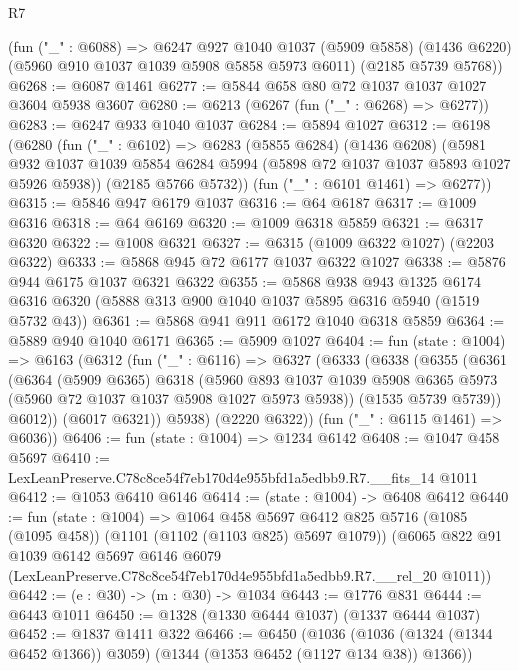 \begin{lexlean}{R7}
\begin{coremodule}
    (fun ("_" : @6088) =>
    @6247
      @927
      @1040
      @1037
      (@5909 @5858)
      (@1436 @6220)
      (@5960 @910 @1037 @1039 @5908 @5858 @5973 @6011)
      (@2185 @5739 @5768))
@6268 := @6087 @1461
@6277 := @5844 @658 @80 @72 @1037 @1037 @1027 @3604 @5938 @3607
@6280 := @6213 (@6267 (fun ("_" : @6268) => @6277))
@6283 := @6247 @933 @1040 @1037
@6284 := @5894 @1027
@6312 := @6198
    (@6280
      (fun ("_" : @6102) =>
      @6283
        (@5855 @6284)
        (@1436 @6208)
        (@5981 @932 @1037 @1039 @5854 @6284 @5994 (@5898 @72 @1037 @1037 @5893 @1027 @5926 @5938))
        (@2185 @5766 @5732))
      (fun ("_" : @6101 @1461) => @6277))
@6315 := @5846 @947 @6179 @1037
@6316 := @64 @6187
@6317 := @1009 @6316
@6318 := @64 @6169
@6320 := @1009 @6318 @5859
@6321 := @6317 @6320
@6322 := @1008 @6321
@6327 := @6315 (@1009 @6322 @1027) (@2203 @6322)
@6333 := @5868 @945 @72 @6177 @1037 @6322 @1027
@6338 := @5876 @944 @6175 @1037 @6321 @6322
@6355 := @5868
    @938
    @943
    @1325
    @6174
    @6316
    @6320
    (@5888 @313 @900 @1040 @1037 @5895 @6316 @5940 (@1519 @5732 @43))
@6361 := @5868 @941 @911 @6172 @1040 @6318 @5859
@6364 := @5889 @940 @1040 @6171
@6365 := @5909 @1027
@6404 := fun (state : @1004) =>
  @6163
    (@6312
      (fun ("_" : @6116) =>
      @6327
        (@6333
          (@6338
            (@6355
              (@6361
                (@6364
                  (@5909 @6365)
                  @6318
                  (@5960
                    @893
                    @1037
                    @1039
                    @5908
                    @6365
                    @5973
                    (@5960 @72 @1037 @1037 @5908 @1027 @5973 @5938))
                  (@1535 @5739 @5739))
                @6012))
            (@6017 @6321))
          @5938)
        (@2220 @6322))
      (fun ("_" : @6115 @1461) => @6036))
@6406 := fun (state : @1004) => @1234 @6142
@6408 := @1047 @458 @5697
@6410 := LexLeanPreserve.C78c8ce54f7eb170d4e955bfd1a5edbb9.R7.__fits_14 @1011
@6412 := @1053 @6410 @6146
@6414 := (state : @1004) -> @6408 @6412
@6440 := fun (state : @1004) =>
  @1064
    @458
    @5697
    @6412
    @825
    @5716
    (@1085 (@1095 @458))
    (@1101 (@1102 (@1103 @825) @5697 @1079))
    (@6065
      @822
      @91
      @1039
      @6142
      @5697
      @6146
      @6079
      (LexLeanPreserve.C78c8ce54f7eb170d4e955bfd1a5edbb9.R7.__rel_20 @1011))
@6442 := (e : @30) -> (m : @30) -> @1034
@6443 := @1776 @831
@6444 := @6443 @1011
@6450 := @1328 (@1330 @6444 @1037) (@1337 @6444 @1037)
@6452 := @1837 @1411 @322
@6466 := @6450
    (@1036 (@1036 (@1324 (@1344 @6452 @1366)) @3059) (@1344 (@1353 @6452 (@1127 @134 @38)) @1366))

\end{coremodule}
\end{lexlean}
